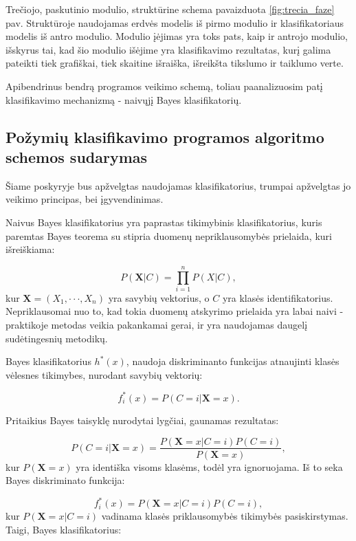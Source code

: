 \documentclass[]{vgtuef}
\begin{document}
Trečiojo, paskutinio modulio, struktūrine schema pavaizduota \ref{fig:trecia_faze} pav. Struktūroje naudojamas erdvės modelis iš pirmo modulio ir klasifikatoriaus modelis iš antro modulio. Modulio įėjimas yra toks pats, kaip ir antrojo modulio, išskyrus tai, kad šio modulio išėjime yra klasifikavimo rezultatas, kurį galima pateikti tiek grafiškai, tiek skaitine išraiška, išreikšta tikslumo ir taiklumo verte.

Apibendrinus bendrą programos veikimo schemą, toliau paanalizuosim patį klasifikavimo mechanizmą - naivųjį Bayes klasifikatorių.

\subsection{Požymių klasifikavimo programos algoritmo schemos sudarymas}
\label{subsec:class_scheme}

Šiame poskyryje bus apžvelgtas naudojamas klasifikatorius, trumpai apžvelgtas jo veikimo principas, bei įgyvendinimas.

Naivus Bayes klasifikatorius \cite{R22230} yra paprastas tikimybinis klasifikatorius, kuris paremtas Bayes teorema su stipria duomenų nepriklausomybės prielaida, kuri išreiškiama:

\begin{equation}
	P(\mathbf{X}|C) = \prod_{i=1}^{n} P(X|C),
\end{equation}
kur $\mathbf{X} = (X_1, \cdot \cdot \cdot, X_n)$ yra savybių vektorius, o $C$ yra klasės identifikatorius. Nepriklausomai nuo to, kad tokia duomenų atskyrimo prielaida yra labai naivi - praktikoje metodas veikia pakankamai gerai, ir yra naudojamas daugelį sudėtingesnių metodikų.

Bayes klasifikatorius $h^*(x)$, naudoja diskriminanto funkcijas atnaujinti klasės vėlesnes tikimybes, nurodant savybių vektorių:

\begin{equation}
	f^*_i(x) = P(C=i|\mathbf{X}=x).
\end{equation}

Pritaikius Bayes taisyklę nurodytai lygčiai, gaunamas rezultatas:

\begin{equation}
P(C=i|\mathbf{X}=x) = \frac{P(\mathbf{X}=x|C=i)P(C=i)}{P(\mathbf{X}=x)},
\end{equation}
kur $P(\mathbf{X}=x)$ yra identiška visoms klasėms, todėl yra ignoruojama. Iš to seka Bayes diskriminato funkcija:

\begin{equation}
	f^*_i(x) = P(\mathbf{X}=x|C=i)P(C=i),
\end{equation}
kur $P(\mathbf{X}=x|C=i)$ vadinama klasės priklausomybės tikimybės pasiskirstymas. Taigi, Bayes klasifikatorius:
\end{document}

